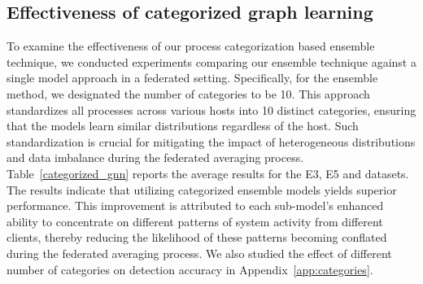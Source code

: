 \subsection{Effectiveness of categorized graph learning}
\label{sub:categorized:learning:efficacy}


To examine the effectiveness of our process categorization based \gnnshort ensemble technique, we conducted experiments comparing our ensemble technique against a single model approach in a federated setting. Specifically, for the ensemble method, we designated the number of categories to be 10. This approach standardizes all processes across various hosts into 10 distinct categories, ensuring that the \gnnshort models learn similar distributions regardless of the host. Such standardization is crucial for mitigating the impact of heterogeneous distributions and data imbalance during the federated averaging process. Table~\ref{categorized_gnn} reports the average results for the \darpa E3, E5 and \optc datasets. The results indicate that utilizing categorized ensemble models yields superior performance. This improvement is attributed to each sub-model's enhanced ability to concentrate on different patterns of system activity from different clients, thereby reducing the likelihood of these patterns becoming conflated during the federated averaging process. We also studied the effect of different number of categories on detection accuracy in Appendix~\ref{app:categories}.%


